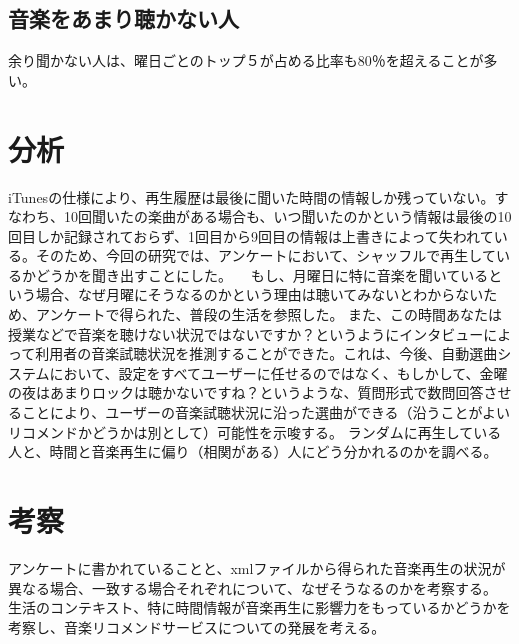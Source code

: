 \documentclass{jsarticle}
\begin{document}
\subsection{音楽をあまり聴かない人}
余り聞かない人は、曜日ごとのトップ５が占める比率も80％を超えることが多い。


\section{分析}
iTunesの仕様により、再生履歴は最後に聞いた時間の情報しか残っていない。すなわち、10回聞いたの楽曲がある場合も、いつ聞いたのかという情報は最後の10回目しか記録されておらず、1回目から9回目の情報は上書きによって失われている。そのため、今回の研究では、アンケートにおいて、シャッフルで再生しているかどうかを聞き出すことにした。
　もし、月曜日に特に音楽を聞いているという場合、なぜ月曜にそうなるのかという理由は聴いてみないとわからないため、アンケートで得られた、普段の生活を参照した。
また、この時間あなたは授業などで音楽を聴けない状況ではないですか？というようにインタビューによって利用者の音楽試聴状況を推測することができた。これは、今後、自動選曲システムにおいて、設定をすべてユーザーに任せるのではなく、もしかして、金曜の夜はあまりロックは聴かないですね？というような、質問形式で数問回答させることにより、ユーザーの音楽試聴状況に沿った選曲ができる（沿うことがよいリコメンドかどうかは別として）可能性を示唆する。
ランダムに再生している人と、時間と音楽再生に偏り（相関がある）人にどう分かれるのかを調べる。

\section{考察}
アンケートに書かれていることと、xmlファイルから得られた音楽再生の状況が異なる場合、一致する場合それぞれについて、なぜそうなるのかを考察する。
生活のコンテキスト、特に時間情報が音楽再生に影響力をもっているかどうかを考察し、音楽リコメンドサービスについての発展を考える。
\end{document}
